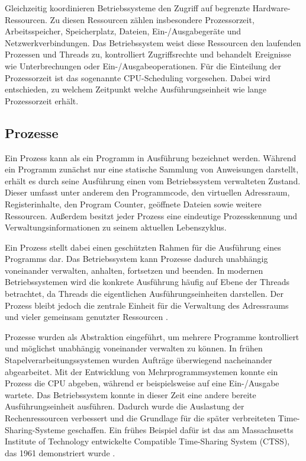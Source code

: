 Gleichzeitig koordinieren Betriebssysteme den Zugriff auf begrenzte Hardware-Ressourcen. Zu diesen Ressourcen zählen insbesondere Prozessorzeit, Arbeitsspeicher, Speicherplatz, Dateien, Ein-/Ausgabegeräte und Netzwerkverbindungen. Das Betriebssystem weist diese Ressourcen den laufenden Prozessen und Threads zu, kontrolliert Zugriffsrechte und behandelt Ereignisse wie Unterbrechungen oder Ein-/Ausgabeoperationen. Für die Einteilung der Prozessorzeit ist das sogenannte CPU-Scheduling vorgesehen. Dabei wird entschieden, zu welchem Zeitpunkt welche Ausführungseinheit wie lange Prozessorzeit erhält.

\subsection{Prozesse}

Ein Prozess kann als ein Programm in Ausführung bezeichnet werden. Während ein Programm zunächst nur eine statische Sammlung von Anweisungen darstellt, erhält es durch seine Ausführung einen vom Betriebssystem verwalteten Zustand. Dieser umfasst unter anderem den Programmcode, den virtuellen Adressraum, Registerinhalte, den Program Counter, geöffnete Dateien sowie weitere Ressourcen. Außerdem besitzt jeder Prozess eine eindeutige Prozesskennung und Verwaltungsinformationen zu seinem aktuellen Lebenszyklus.

Ein Prozess stellt dabei einen geschützten Rahmen für die Ausführung eines Programms dar. Das Betriebssystem kann Prozesse dadurch unabhängig voneinander verwalten, anhalten, fortsetzen und beenden. In modernen Betriebssystemen wird die konkrete Ausführung häufig auf Ebene der Threads betrachtet, da Threads die eigentlichen Ausführungseinheiten darstellen. Der Prozess bleibt jedoch die zentrale Einheit für die Verwaltung des Adressraums und vieler gemeinsam genutzter Ressourcen \cite{stallings_betriebssysteme,tanenbaum_moderne_betriebssysteme_de}.

Prozesse wurden als Abstraktion eingeführt, um mehrere Programme kontrolliert und möglichst unabhängig voneinander verwalten zu können. In frühen Stapelverarbeitungssystemen wurden Aufträge überwiegend nacheinander abgearbeitet. Mit der Entwicklung von Mehrprogrammsystemen konnte ein Prozess die CPU abgeben, während er beispielsweise auf eine Ein-/Ausgabe wartete. Das Betriebssystem konnte in dieser Zeit eine andere bereite Ausführungseinheit ausführen. Dadurch wurde die Auslastung der Rechenressourcen verbessert und die Grundlage für die später verbreiteten Time-Sharing-Systeme geschaffen. Ein frühes Beispiel dafür ist das am Massachusetts Institute of Technology entwickelte Compatible Time-Sharing System (CTSS), das 1961 demonstriert wurde \cite{computerhistory_ctss}.

